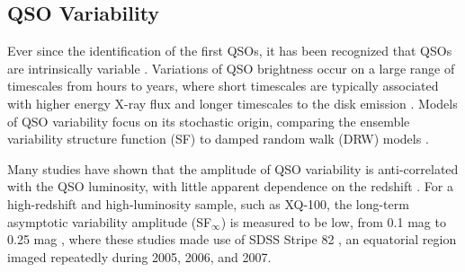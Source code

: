 \documentclass[fleqn,usenatbib]{mnras}
\begin{document}
\begingroup
\begin{table}
\end{table}
\endgroup

\subsection{QSO Variability} \label{sec:variability}
Ever since the identification of the first QSOs, it has been recognized that QSOs are intrinsically variable \citep{Matthews_1963}. Variations of QSO brightness occur on a large range of timescales from hours to years, where short timescales are typically associated with higher energy X-ray flux and longer timescales to the disk emission \citep{Edelson_2015, Lira_2015}. Models of QSO variability focus on its stochastic origin, comparing the ensemble variability structure function (SF) to damped random walk (DRW) models \citep[e.g.,][]{Kelly_2009, MacLeod_2010, Kozlowski_2016, Suberlak_2021}. 

Many studies have shown that the amplitude of QSO variability is anti-correlated with the QSO luminosity, with little apparent dependence on the redshift \citep[e.g.,][]{VandenBerk_2004, MacLeod_2010, Kozlowski_2016, Caplar_2017}. For a high-redshift and high-luminosity sample, such as XQ-100, the long-term asymptotic variability amplitude (SF$_{\infty}$) is measured to be low, from 0.1 mag \citep[e.g.,][]{MacLeod_2010, Suberlak_2021} to 0.25 mag \citep[e.g.,][]{Kozlowski_2016}, where these studies made use of SDSS Stripe 82 \citep{Jiang_2014_Stripe82}, an equatorial region imaged repeatedly during 2005, 2006, and 2007.
\end{document}
